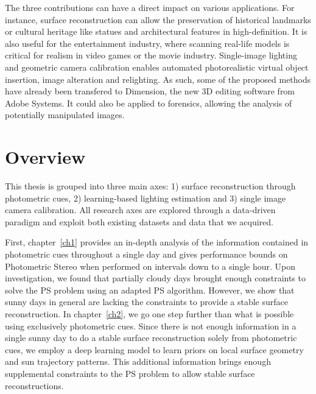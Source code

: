 
The three contributions can have a direct impact on various applications. For instance, surface reconstruction can allow the preservation of historical landmarks or cultural heritage like statues and architectural features in high-definition. It is also useful for the entertainment industry, where scanning real-life models is critical for realism in video games or the movie industry. Single-image lighting and geometric camera calibration enables automated photorealistic virtual object insertion, image alteration and relighting. As such, some of the proposed methods have already been transfered to Dimension, the new 3D editing software from Adobe Systems. It could also be applied to forensics, allowing the analysis of potentially manipulated images. 

\section*{Overview}

This thesis is grouped into three main axes: 1) surface reconstruction through photometric cues, 2) learning-based lighting estimation and 3) single image camera calibration. All research axes are explored through a data-driven paradigm and exploit both existing datasets and data that we acquired. 

First, chapter~\ref{ch1} provides an in-depth analysis of the information contained in photometric cues throughout a single day and gives performance bounds on Photometric Stereo when performed on intervals down to a single hour. Upon investigation, we found that partially cloudy days brought enough constraints to solve the PS problem using an adapted PS algorithm. However, we show that sunny days in general are lacking the constraints to provide a stable surface reconstruction. In chapter~\ref{ch2}, we go one step further than what is possible using exclusively photometric cues. Since there is not enough information in a single sunny day to do a stable surface reconstruction solely from photometric cues, we employ a deep learning model to learn priors on local surface geometry and sun trajectory patterns. This additional information brings enough supplemental constraints to the PS problem to allow stable surface reconstructions. 

